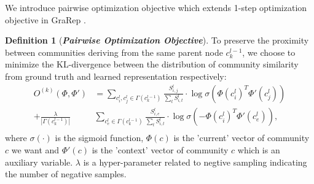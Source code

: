 \documentclass{article}
\theoremstyle{definition}
\newtheorem{defn}{Definition}
\begin{document}
		We introduce pairwise optimization objective which extends 1-step optimization objective in GraRep \cite{Cao2015GraRep}.
		\begin{defn}[\textbf{\emph{Pairwise Optimization Objective}}]
			To preserve the proximity between communities deriving from the same parent node $c_k^{l-1}$, we choose to minimize the KL-divergence between the distribution of community similarity from ground truth and learned representation respectively: 
			\begin{equation}
			\label{equ:local_loss} 
			\begin{split}
			O^{(k)}(\Phi, \Phi') & = \sum_{c_i^l, c_j^l \in \Gamma(c_k^{l-1})} \frac{S_{i,j}^l}{\sum_t S_{i, t}^l} \cdot \log{\sigma(\Phi(c_i^l)^T \Phi'(c_j^l))} \\
			+ \frac{\lambda}{|\Gamma(c_k^{l-1})|}&\sum_{c_e^l \in \Gamma(c_k^{l-1})} \frac{S_{i, e}^l}{\sum_t S_{i, t}^l} \cdot \log{\sigma(-\Phi(c_i^l)^T \Phi'(c_e^l))}, \\
			\end{split}
			\end{equation}
			where $\sigma(\cdot)$ is the sigmoid function, $\Phi(c)$ is the 'current' vector of community $c$ we want and $\Phi'(c)$ is the 'context' vector of community $c$ which is an auxiliary variable.
			$\lambda$ is a hyper-parameter related to negtive sampling indicating the number of negative samples.
		\end{defn}
 
\end{document}

